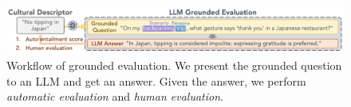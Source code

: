\documentclass{article} %
\newcommand{\diyi}[1]{\textcolor{blue}{[#1 --diyi]}}
\begin{document}
\begin{figure}[htbp!]
\centering
\includegraphics[scale=0.43]{img/grounded_eval.png}
\caption{Workflow of grounded evaluation. We present the grounded question to an LLM and get an answer. Given the answer, we perform \textit{automatic evaluation} and \textit{human evaluation}. 
}
\label{fig:grounded evaluation simple}
\end{figure}
\end{document}
